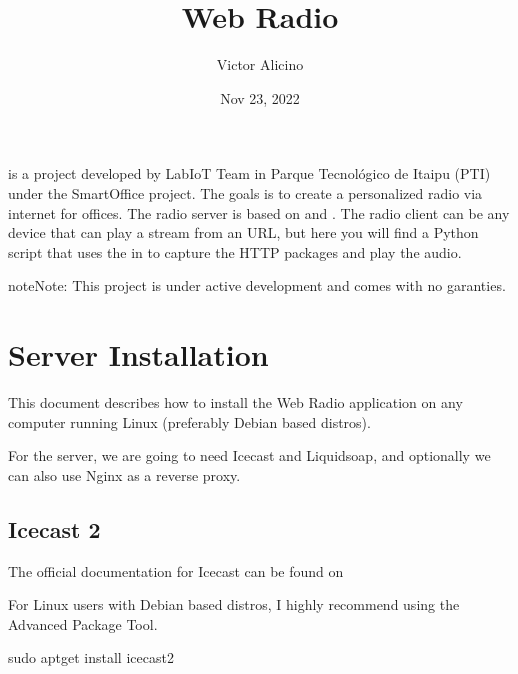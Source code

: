 \documentclass[letterpaper,10pt,english]{sphinxmanual}
\title{Web Radio}
\date{Nov 23, 2022}
\author{Victor Alicino}
\begin{document}
\pagestyle{empty}
\sphinxmaketitle
\pagestyle{plain}
\sphinxtableofcontents
\pagestyle{normal}
\label{\detokenize{index::doc}}


\sphinxAtStartPar
{} is a project developed by LabIoT Team in Parque Tecnológico de Itaipu (PTI) under the SmartOffice project.
The goals is to create a personalized radio via internet for offices.
The radio server is based on  and .
The radio client can be any device that can play a stream from an URL, but here you will find a Python script that uses the
 in  to capture the HTTP
packages and play the audio.

\begin{sphinxadmonition}{note}{Note:}
\sphinxAtStartPar
This project is under active development and
comes with no garanties.
\end{sphinxadmonition}

\sphinxstepscope


\chapter{Server Installation}
\label{\detokenize{server_install:server-installation}}\label{\detokenize{server_install::doc}}
\sphinxAtStartPar
This document describes how to install the Web Radio application on any computer running Linux
(preferably Debian based distros).

\sphinxAtStartPar
For the server, we are going to need Icecast and Liquidsoap, and optionally we can also use Nginx as a reverse proxy.


\section{Icecast 2}
\label{\detokenize{server_install:icecast-2}}
\sphinxAtStartPar
The official documentation for Icecast can be found on 

\sphinxAtStartPar
For Linux users with Debian based distros, I highly recommend using the Advanced Package Tool.

\begin{sphinxVerbatim}[commandchars=\\\{\}]
sudo apt\PYGZhy{}get install icecast2
\end{sphinxVerbatim}
\end{document}
